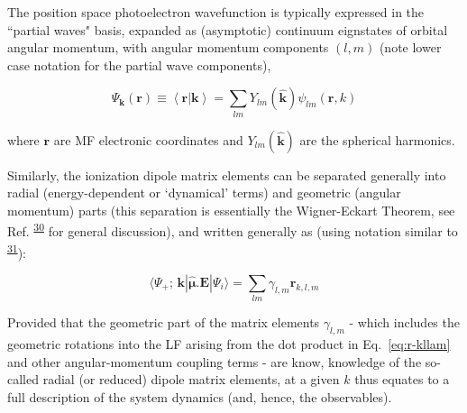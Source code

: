 \documentclass[10pt]{article}
\begin{document}
The position space photoelectron wavefunction is typically expressed in the ``partial waves" basis, expanded as (asymptotic) continuum eignstates of orbital angular momentum, with angular momentum components $(l,m)$ (note lower case notation for the partial wave components),  

\begin{equation}
\Psi_\mathbf{k}(\bm{r})\equiv\left<\bm{r}|\mathbf{k}\right> = \sum_{lm}Y_{lm}(\mathbf{\hat{k}})\psi_{lm}(\bm{r},k)
\label{eq:elwf}
\end{equation}

where $\bm{r}$ are MF electronic coordinates and $Y_{lm}(\mathbf{\hat{k}})$ are the spherical harmonics.

Similarly, the ionization dipole matrix elements can be separated generally into radial (energy-dependent or `dynamical' terms) and geometric (angular momentum) parts (this separation is essentially the Wigner-Eckart Theorem, see Ref. \textsuperscript{\hyperref[csl:30]{30}} for general discussion), and written generally as (using notation similar to \textsuperscript{\hyperref[csl:31]{31}}): 

\begin{equation}
\langle\Psi_{+};\,\mathbf{k}|\hat{\mathbf{\mu}}.\boldsymbol{\mathbf{E}}|\Psi_{i}\rangle = \sum_{lm}\gamma_{l,m}\mathbf{r}_{k,l,m}
\label{eq:r-kllam}
\end{equation}


Provided that the geometric part of the matrix elements $\gamma_{l,m}$ - which includes the geometric rotations  into the LF arising from the dot product in Eq.~\ref{eq:r-kllam} and other angular-momentum coupling terms - are know, knowledge of the so-called radial (or reduced) dipole matrix elements, at a given 
$k$ %
thus equates to a full description of the system dynamics (and, hence, the observables).

\end{document}

